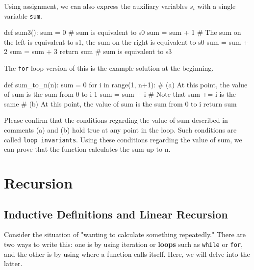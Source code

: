 Using assignment, we can also express the auxiliary variables $s_i$ with a single variable \texttt{sum}.
\begin{pybox}
def sum3():
    sum = 0 # sum is equivalent to s0
    sum = sum + 1 # The sum on the left is equivalent to s1, the sum on the right is equivalent to s0
    sum = sum + 2
    sum = sum + 3
    return sum # sum is equivalent to s3
\end{pybox}
The \texttt{for} loop version of this is the example solution at the beginning.

\begin{pybox}[emph=sum]
def sum_to_n(n):
    sum = 0
    for i in range(1, n+1):
        # (a) At this point, the value of sum is the sum from 0 to i-1
        sum = sum + i  # Note that sum += i is the same
        # (b) At this point, the value of sum is the sum from 0 to i
    return sum
\end{pybox}
Please confirm that the conditions regarding the value of sum described in comments (a) and (b) hold true at any point in the loop. Such conditions are called \texttt{loop invariants}.
Using these conditions regarding the value of sum, we can prove that the function calculates the sum up to n.

\section{Recursion}\label{section:recursion}

\subsection{Inductive Definitions and Linear Recursion}\label{section:linear}

Consider the situation of "wanting to calculate something repeatedly." There are two ways to write this: one is by using iteration or \textbf{loops} such as \texttt{while} or \texttt{for}, and the other is by using  where a function calls itself. Here, we will delve into the latter.

